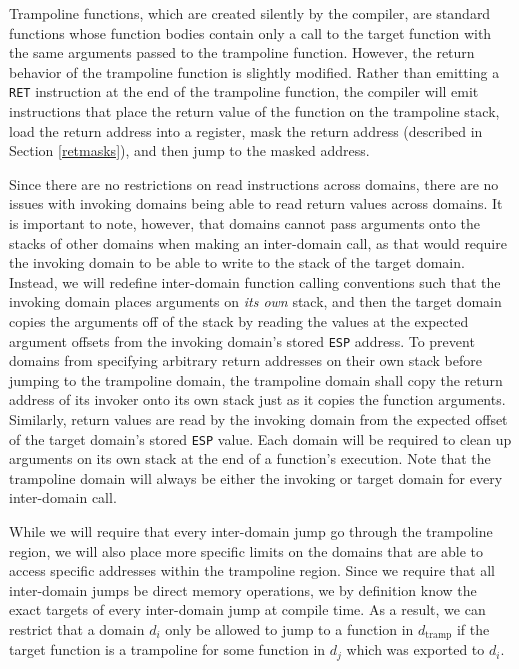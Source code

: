 \documentclass[12pt]{article}
\begin{document}
Trampoline functions, which are created silently by the compiler, are standard functions whose function bodies contain only a call to the target function with the same arguments passed to the trampoline function. However, the return behavior of the trampoline function is slightly modified. Rather than emitting a \texttt{RET} instruction at the end of the trampoline function, the compiler will emit instructions that place the return value of the function on the trampoline stack, load the return address into a register, mask the return address (described in Section \ref{retmasks}), and then jump to the masked address.

Since there are no restrictions on read instructions across domains, there are no issues with invoking domains being able to read return values across domains. It is important to note, however, that domains cannot pass arguments onto the stacks of other domains when making an inter-domain call, as that would require the invoking domain to be able to write to the stack of the target domain. Instead, we will redefine inter-domain function calling conventions such that the invoking domain places arguments on \textit{its own} stack, and then the target domain copies the arguments off of the stack by reading the values at the expected argument offsets from the invoking domain's stored \texttt{ESP} address. To prevent domains from specifying arbitrary return addresses on their own stack before jumping to the trampoline domain, the trampoline domain shall copy the return address of its invoker onto its own stack just as it copies the function arguments. Similarly, return values are read by the invoking domain from the expected offset of the target domain's stored \texttt{ESP} value. Each domain will be required to clean up arguments on its own stack at the end of a function's execution. Note that the trampoline domain will always be either the invoking or target domain for every inter-domain call.

While we will require that every inter-domain jump go through the trampoline region, we will also place more specific limits on the domains that are able to access specific addresses within the trampoline region. Since we require that all inter-domain jumps be direct memory operations, we by definition know the exact targets of every inter-domain jump at compile time. As a result, we can restrict that a domain $d_i$ only be allowed to jump to a function in $d_\text{tramp}$ if the target function is a trampoline for some function in $d_j$ which was exported to $d_i$.
\end{document}
